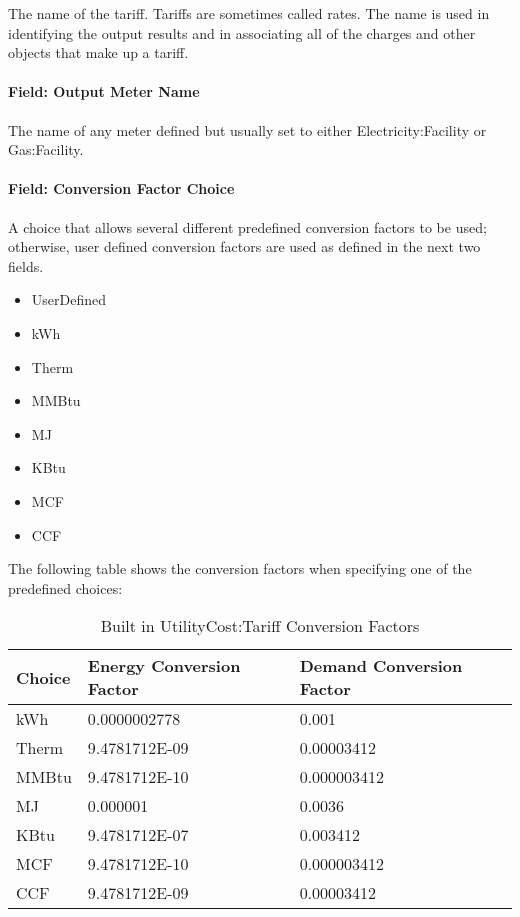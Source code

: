 The name of the tariff. Tariffs are sometimes called rates. The name is used in identifying the output results and in associating all of the charges and other objects that make up a tariff.

\paragraph{Field: Output Meter Name}\label{field-output-meter-name}

The name of any meter defined but usually set to either Electricity:Facility or Gas:Facility.

\paragraph{Field: Conversion Factor Choice}\label{field-conversion-factor-choice}

A choice that allows several different predefined conversion factors to be used; otherwise, user defined conversion factors are used as defined in the next two fields.

\begin{itemize}
\item
  UserDefined
\item
  kWh
\item
  Therm
\item
  MMBtu
\item
  MJ
\item
  KBtu
\item
  MCF
\item
  CCF
\end{itemize}

The following table shows the conversion factors when specifying one of the predefined choices:

\begin{longtable}[c]{@{}lll@{}}
\caption{Built in UtilityCost:Tariff Conversion Factors \protect \label{table:built-in-utilitycost-tariff-conversion}}\\
\toprule 
Choice & Energy Conversion Factor & Demand Conversion Factor \tabularnewline \midrule
\endhead
kWh & 0.0000002778 & 0.001 \tabularnewline
Therm & 9.4781712E-09 & 0.00003412 \tabularnewline
MMBtu & 9.4781712E-10 & 0.000003412 \tabularnewline
MJ & 0.000001 & 0.0036 \tabularnewline
KBtu & 9.4781712E-07 & 0.003412 \tabularnewline
MCF & 9.4781712E-10 & 0.000003412 \tabularnewline
CCF & 9.4781712E-09 & 0.00003412 \tabularnewline
\bottomrule
\end{longtable}

